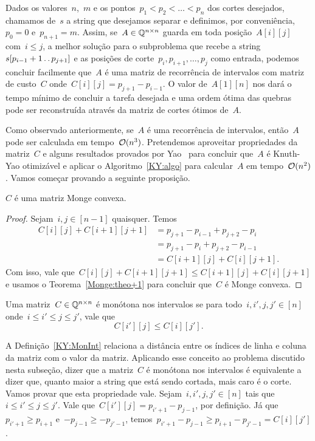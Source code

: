 Dados os valores~$n$,~$m$ e os pontos~$p_1 < p_2 < \dots < p_{n}$ dos cortes desejados, chamamos de~$s$ a string que desejamos separar e definimos, por conveniência,~$p_0 = 0$ e~$p_{n+1} = m$. Assim, se~${A \in \mathbb{Q}^{n \times n}}$ guarda em toda posição~$A[i][j]$ com~$i \leq j$, a melhor solução para o subproblema que recebe a string~${s[p_{i-1} + 1 \,.\,.\, p_{j+1}]}$ e as posições de corte~$p_{i},p_{i+1},\dots,p_{j}$ como entrada, podemos concluir facilmente que~$A$ é uma matriz de recorrência de intervalos com matriz de custo~$C$ onde~$C[i][j] = p_{j+1} - p_{i-1}$. O valor de~$A[1][n]$ nos dará o tempo mínimo de concluir a tarefa desejada e uma ordem ótima das quebras pode ser reconstruída através da matriz de cortes ótimos de~$A$.

Como observado anteriormente, se~$A$ é uma recorrência de intervalos, então~$A$ pode ser calculada em tempo~$\mathcal{O}(n^3)$. Pretendemos aproveitar propriedades da matriz~$C$ e alguns resultados provados por Yao~\cite{Yao:1980} para concluir que~$A$ é Knuth-Yao otimizável e aplicar o Algoritmo~\ref{KY:algo} para calcular~$A$ em tempo~$\mathcal{O}(n^2)$. Vamos começar provando a seguinte proposição.

\begin{prop}
$C$ é uma matriz Monge convexa.
\end{prop}

\begin{proof}
Sejam~$i,j \in [n-1]$ quaisquer. Temos 
\begin{align*}
    C[i][j] + C[i+1][j+1] &= p_{j+1} - p_{i-1} + p_{j+2} - p_{i} \\
                          &= p_{j+1} - p_{i} + p_{j+2} - p_{i-1} \\
                          &= C[i+1][j] + C[i][j+1] \text{.}
\end{align*}
Com isso, vale que~$C[i][j] + C[i+1][j+1] \leq C[i+1][j] + C[i][j+1]$ e usamos o Teorema~\ref{Monge:theo+1} para concluir que~$C$ é Monge convexa.
\end{proof}

\begin{defi} \label{KY:MonInt}
Uma matriz~$C \in \mathbb{Q}^{n \times n}$ é monótona nos intervalos se para todo~$i,i',j,j' \in [n]$ onde~$i \leq i' \leq j \leq j'$, vale que
$$C[i'][j] \leq C[i][j'] \text{.}$$
\end{defi}

A Definição~\ref{KY:MonInt} relaciona a distância entre os índices de linha e coluna da matriz com o valor da matriz. Aplicando esse conceito ao problema discutido nesta subseção, dizer que a matriz~$C$ é monótona nos intervalos é equivalente a dizer que, quanto maior a string que está sendo cortada, mais caro é o corte. Vamos provar que esta propriedade vale. Sejam~${i,i',j,j' \in [n]}$ tais que~${ i \leq i' \leq j \leq j' }$. Vale que~${ C[i'][j] = p_{i'+1} - p_{j-1} }$, por definição. Já que~${ p_{i'+1} \geq p_{i+1} }$ e~${ -p_{j-1} \geq -p_{j'-1} }$, temos~${ p_{i' + 1} - p_{j-1} \geq p_{i+1} - p_{ j'-1} = C[i][j'] }$.

